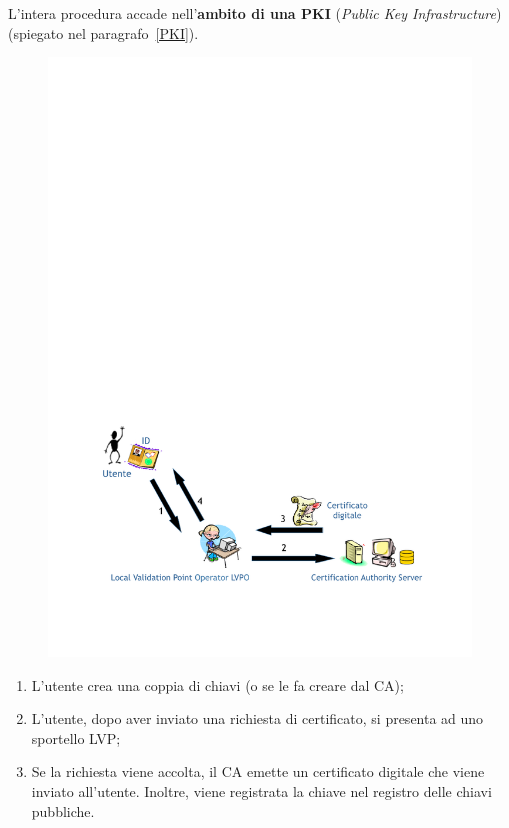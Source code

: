 \documentclass[a4paper]{article}
\begin{document}
	\noindent
	L'intera procedura accade nell'\textbf{ambito di una PKI} (\emph{Public Key Infrastructure}) (spiegato nel paragrafo~\ref{PKI}).
	\begin{figure}[!htp]
		\centering
		\includegraphics[width=\textwidth]{img/int-aut_e_autor/certificato-digitale.pdf}
	\end{figure}
	\begin{enumerate}
		\item L'utente crea una coppia di chiavi (o se le fa creare dal CA);
		
		\item L'utente, dopo aver inviato una richiesta di certificato, si presenta ad uno sportello LVP;
		
		\item Se la richiesta viene accolta, il CA emette un certificato digitale che viene inviato all'utente. Inoltre, viene registrata la chiave nel registro delle chiavi pubbliche.
	\end{enumerate}\newpage
	
\end{document}

